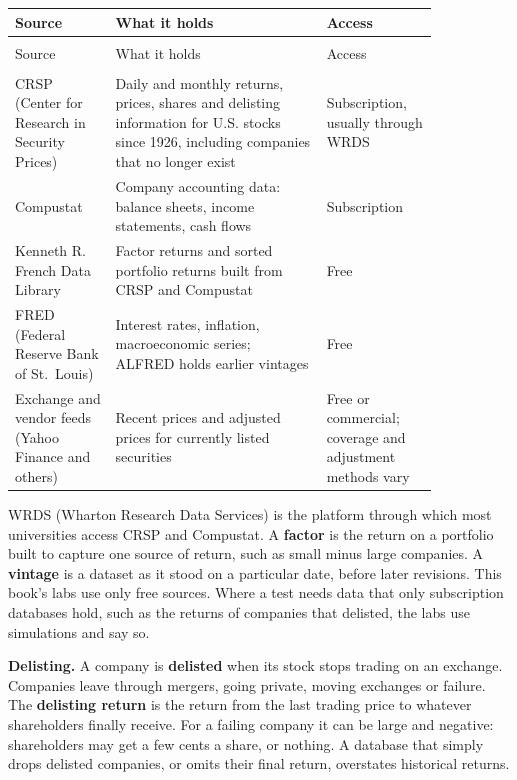 \begingroup
\small
\setlength{\LTpre}{6pt}\setlength{\LTpost}{6pt}
\begin{longtable}{@{}>{\raggedright\arraybackslash}p{0.2\linewidth}>{\raggedright\arraybackslash}p{0.42\linewidth}>{\raggedright\arraybackslash}p{0.22\linewidth}@{}}
\toprule
Source & What it holds & Access \\
\midrule
\endfirsthead
\multicolumn{3}{@{}l}{\emph{(continued)}}\\
\toprule
Source & What it holds & Access \\
\midrule
\endhead
\midrule
\multicolumn{3}{r@{}}{\emph{continued on next page}}\\
\endfoot
\bottomrule
\endlastfoot
CRSP (Center for Research in Security Prices) & Daily and monthly returns, prices, shares and delisting information for U.S. stocks since 1926, including companies that no longer exist & Subscription, usually through WRDS \\
Compustat & Company accounting data: balance sheets, income statements, cash flows & Subscription \\
Kenneth R. French Data Library & Factor returns and sorted portfolio returns built from CRSP and Compustat & Free \\
FRED (Federal Reserve Bank of St.\ Louis) & Interest rates, inflation, macroeconomic series; ALFRED holds earlier vintages & Free \\
Exchange and vendor feeds (Yahoo Finance and others) & Recent prices and adjusted prices for currently listed securities & Free or commercial; coverage and adjustment methods vary \\
\end{longtable}
\endgroup

WRDS (Wharton Research Data Services) is the platform through which most universities access CRSP and Compustat. A \textbf{factor} is the return on a portfolio built to capture one source of return, such as small minus large companies. A \textbf{vintage} is a dataset as it stood on a particular date, before later revisions. This book's labs use only free sources. Where a test needs data that only subscription databases hold, such as the returns of companies that delisted, the labs use simulations and say so.

\textbf{Delisting.} A company is \textbf{delisted} when its stock stops trading on an exchange. Companies leave through mergers, going private, moving exchanges or failure. The \textbf{delisting return} is the return from the last trading price to whatever shareholders finally receive. For a failing company it can be large and negative: shareholders may get a few cents a share, or nothing. A database that simply drops delisted companies, or omits their final return, overstates historical returns.

